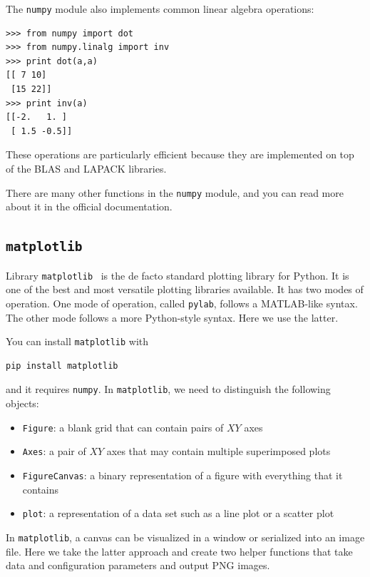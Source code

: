 \documentclass[justified,sixbynine]{tufte-book}
\def\ft{\small\tt}
\theoremstyle{plain}%
\theoremstyle{definition}
\theoremstyle{remark}
\begin{document}
\begin{fullwidth}
The {\ft numpy} module also implements common linear algebra operations:

\begin{lstlisting}
>>> from numpy import dot
>>> from numpy.linalg import inv
>>> print dot(a,a)
[[ 7 10]
 [15 22]]
>>> print inv(a)
[[-2.   1. ]
 [ 1.5 -0.5]]
\end{lstlisting}

These operations are particularly efficient because they are implemented on top of the BLAS and LAPACK libraries.

There are many other functions in the {\ft numpy} module, and you can read more about it in the official documentation.

\goodbreak\subsection{{\ft matplotlib}}


Library {\ft matplotlib}~\cite{matplotlib} is the de facto standard plotting library for Python. It is one of the best and most versatile plotting libraries available. It has two modes of operation. One mode of operation, called {\ft pylab}, follows a MATLAB-like syntax. The other mode follows a more Python-style syntax. Here we use the latter.

You can install {\ft matplotlib} with
\begin{lstlisting}
pip install matplotlib
\end{lstlisting}
and it requires {\ft numpy}.
In {\ft matplotlib}, we need to distinguish the following objects:
\begin{itemize}
\item {\ft Figure}: a blank grid that can contain pairs of $XY$ axes
\item {\ft Axes}: a pair of $XY$ axes that may contain multiple superimposed plots
\item {\ft FigureCanvas}: a binary representation of a figure with everything that it contains
\item {\ft plot}: a representation of a data set such as a line plot or a scatter plot
\end{itemize}

In {\ft matplotlib}, a canvas can be visualized in a window or serialized into an image file. Here we take the latter approach and create two helper functions that take data and configuration parameters and output PNG images.


\end{fullwidth}
\end{document}
